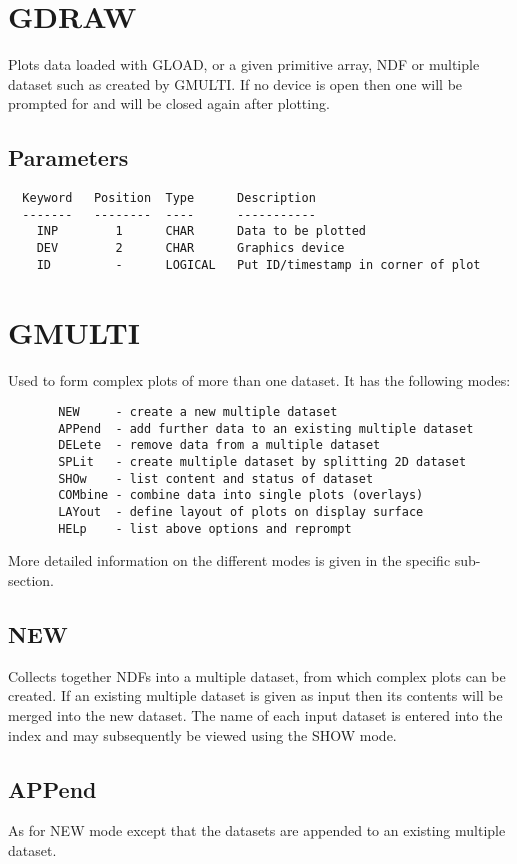 \documentclass{book}
\renewcommand{\_}{{\tt\char'137}}     %
\begin{document}
\section{GDRAW}
Plots data loaded with GLOAD, or a given primitive array, NDF
or multiple dataset such as created by GMULTI. If no device
is open then one will be prompted for and will be closed again
after plotting.

\subsection{Parameters}
\begin{verbatim}
  Keyword   Position  Type      Description
  -------   --------  ----      -----------
    INP        1      CHAR      Data to be plotted
    DEV        2      CHAR      Graphics device
    ID         -      LOGICAL   Put ID/timestamp in corner of plot

\end{verbatim}\section{GMULTI}
Used to form complex plots of more than one dataset. It has the
following modes:

\begin{verbatim}
       NEW     - create a new multiple dataset
       APPend  - add further data to an existing multiple dataset
       DELete  - remove data from a multiple dataset
       SPLit   - create multiple dataset by splitting 2D dataset
       SHOw    - list content and status of dataset
       COMbine - combine data into single plots (overlays)
       LAYout  - define layout of plots on display surface
       HELp    - list above options and reprompt
 \end{verbatim}
More detailed information on the different modes is given in the
specific sub-section.

\subsection{NEW}
Collects together NDFs into a multiple dataset, from which complex
plots can be created. If an existing multiple dataset is given as
input then its contents will be merged into the new dataset. The
name of each input dataset is entered into the index and may
subsequently be viewed using the SHOW mode.

\subsection{APPend}
As for NEW mode except that the datasets are appended to an existing
multiple dataset.
\end{document}
